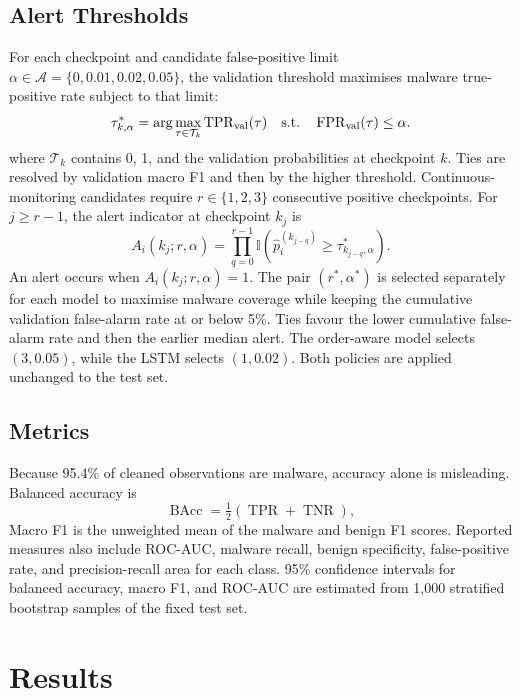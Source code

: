 \documentclass[10pt,twocolumn]{article}
\begin{document}
\subsection{Alert Thresholds}
For each checkpoint and candidate false-positive limit $\alpha\in\mathcal{A}=\{0,0.01,0.02,0.05\}$, the validation threshold maximises malware true-positive rate subject to that limit:
\begin{equation}
 \tau_{k,\alpha}^*=\arg\max_{\tau\in\mathcal{T}_k}
 \operatorname{TPR}_{\rm val}(\tau)
 \quad\text{s.t.}\quad \operatorname{FPR}_{\rm val}(\tau)\leq\alpha.
 \label{eq:threshold}
\end{equation}
where $\mathcal{T}_k$ contains 0, 1, and the validation probabilities at checkpoint $k$. Ties are resolved by validation macro F1 and then by the higher threshold. Continuous-monitoring candidates require $r\in\{1,2,3\}$ consecutive positive checkpoints. For $j\geq r-1$, the alert indicator at checkpoint $k_j$ is
\begin{equation}
 A_i(k_j;r,\alpha)=\prod_{q=0}^{r-1}
 \mathbb{I}\!\left(\hat p_i^{(k_{j-q})}\geq\tau_{k_{j-q},\alpha}^*\right).
 \label{eq:alert}
\end{equation}
An alert occurs when $A_i(k_j;r,\alpha)=1$. The pair $(r^*,\alpha^*)$ is selected separately for each model to maximise malware coverage while keeping the cumulative validation false-alarm rate at or below 5\%. Ties favour the lower cumulative false-alarm rate and then the earlier median alert. The order-aware model selects $(3,0.05)$, while the LSTM selects $(1,0.02)$. Both policies are applied unchanged to the test set.

\subsection{Metrics}
Because 95.4\% of cleaned observations are malware, accuracy alone is misleading. Balanced accuracy is
\begin{equation}
 \operatorname{BAcc}=\tfrac{1}{2}(\operatorname{TPR}+\operatorname{TNR}),
 \label{eq:bacc}
\end{equation}
Macro F1 is the unweighted mean of the malware and benign F1 scores. Reported measures also include ROC-AUC, malware recall, benign specificity, false-positive rate, and precision-recall area for each class. 95\% confidence intervals for balanced accuracy, macro F1, and ROC-AUC are estimated from 1,000 stratified bootstrap samples of the fixed test set.

\section{Results}
\end{document}
